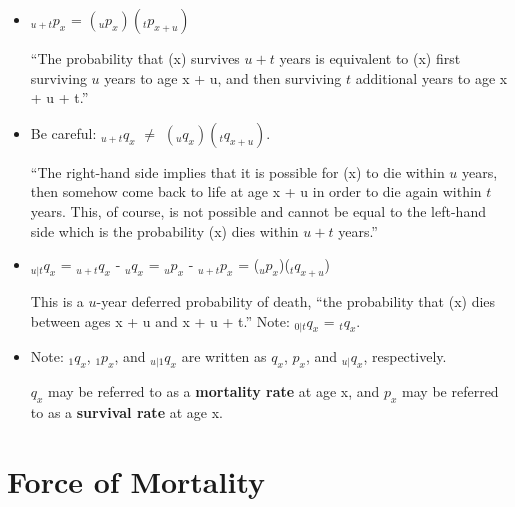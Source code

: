 \documentclass[]{book}
\begin{document}
\begin{itemize}
\item
  \({}_{u + t}p_x\) = \(({}_{u}p_x)\)\(({}_{t}p_{x + u})\)

  ``The probability that (x) survives \(u + t\) years is equivalent to
  (x) first surviving \(u\) years to age x + u, and then surviving \(t\)
  additional years to age x + u + t.''
\item
  Be careful: \({}_{u + t}q_x\) \(\neq\)
  \(({}_{u}q_x)\)\(({}_{t}q_{x + u})\).

  ``The right-hand side implies that it is possible for (x) to die
  within \(u\) years, then somehow come back to life at age x + u in
  order to die again within \(t\) years. This, of course, is not
  possible and cannot be equal to the left-hand side which is the
  probability (x) dies within \(u + t\) years.''
\item
  \({}_{u|t}q_x\) = \({}_{u + t}q_x\) - \({}_{u}q_x\) = \({}_{u}p_x\) -
  \({}_{u + t}p_x\) = (\({}_{u}p_x\))(\({}_{t}q_{x + u}\))

  This is a \(u\)-year deferred probability of death, ``the probability
  that (x) dies between ages x + u and x + u + t.'' Note:
  \({}_{0|t}q_x\) = \({}_{t}q_x\).
\item
  Note: \({}_{1}q_x\), \({}_{1}p_x\), and \({}_{u|1}q_x\) are written as
  \(q_x\), \(p_x\), and \({}_{u|}q_x\), respectively.

  \(q_x\) may be referred to as a \textbf{mortality rate} at age x, and
  \(p_x\) may be referred to as a \textbf{survival rate} at age x.
\end{itemize}

\section{Force of Mortality}\label{force-of-mortality}
\end{document}
